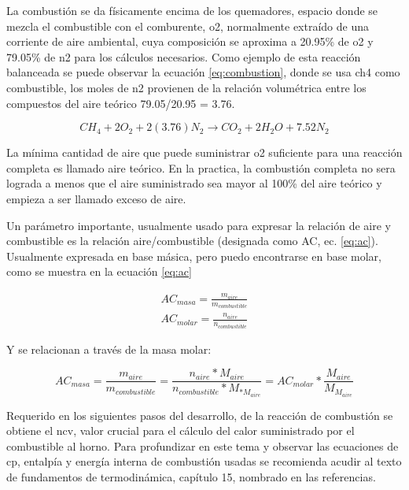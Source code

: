 \par La combustión se da físicamente encima de los quemadores, espacio donde se mezcla el combustible con el comburente, \ac{o2}, normalmente extraído de una corriente de aire ambiental, cuya composición se aproxima a 20.95\% de \ac{o2} y 79.05\% de \ac{n2} para los cálculos necesarios. Como ejemplo de esta reacción balanceada se puede observar la ecuación \ref{eq:combustion}, donde se usa \ac{ch4} como combustible, los moles de \ac{n2} provienen de la relación volumétrica entre los compuestos del aire teórico 79.05/20.95 = 3.76.

\begin{equation}
    \label{eq:combustion}
    CH_4 + 2O_2 + 2(3.76)N_2 \rightarrow CO_2 + 2H_2O + 7.52N_2
\end{equation}

\par La mínima cantidad de aire que puede suministrar \ac{o2} suficiente para una reacción completa es llamado aire teórico. En la practica, la combustión completa no sera lograda a menos que el aire suministrado sea mayor al 100\% del aire teórico y empieza a ser llamado exceso de aire.

\par Un parámetro importante, usualmente usado para expresar la relación de aire y combustible es la relación aire/combustible (designada como AC, ec. \ref{eq:ac}). Usualmente expresada en base másica, pero puedo encontrarse en base molar, como se muestra en la ecuación \ref{eq:ac}

\begin{gather}
    \label{eq:ac}
    AC_{masa} = \frac{m_{aire}}{m_{combustible}}\\
    AC_{molar} = \frac{n_{aire}}{n_{combustible}}
\end{gather}

\par Y se relacionan a través de la masa molar:

\begin{equation}
    AC_{masa} = \frac{m_{aire}}{m_{combustible}} =
    \frac{n_{aire}*M_{aire}}{n_{combustible}*M_{*M_{aire}}} = AC_{molar}*\frac{M_{aire}}{M_{M_{aire}}}
\end{equation}

\par Requerido en los siguientes pasos del desarrollo, de la reacción de combustión se obtiene el \ac{ncv}, valor crucial para el cálculo del calor suministrado por el combustible al horno. Para profundizar en este tema y observar las ecuaciones de \ac{cp}, entalpía y energía interna de combustión usadas se recomienda acudir al texto de fundamentos de termodinámica\cite{bib:vanwylen}, capítulo 15, nombrado en las referencias.

